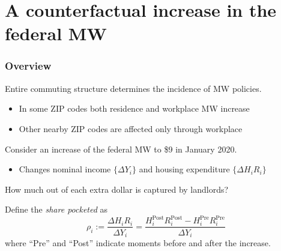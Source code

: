 \documentclass[aspectratio=169, t]{beamer}
\newcommand{\pre}{\text{Pre}}
\newcommand{\post}{\text{Post}}
\begin{document}
\section{A counterfactual increase in the federal MW}

\begin{frame}
    \frametitle{Overview}
    
    Entire commuting structure determines the incidence of MW policies.
    \begin{itemize}
        \vspace{1mm}
        \item In some ZIP codes both residence and workplace MW increase
        \vspace{1mm}
        \item Other nearby ZIP codes are affected only through workplace
    \end{itemize}
    
    \pause
    \vspace{3mm}
    Consider an increase of the federal MW to \$9 in January 2020.
    \begin{itemize}
        \vspace{1mm}
        \item Changes nominal income $\{\Delta Y_i\}$ and housing expenditure $\{\Delta H_i R_i\}$
    \end{itemize}
    
    \vspace{2mm}
    How much out of each extra dollar is captured by landlords?
    \pause 

    \vspace{2mm}
    Define the \textit{share pocketed} as 
    \begin{equation*}
        \rho_i := \frac{\Delta H_i R_i}{\Delta Y_i} =  \frac{H^{\post}_i R^{\post}_i - H^{\pre}_i R^{\pre}_i}{\Delta Y_i}
    \end{equation*}
    where ``Pre'' and ``Post'' indicate moments before and after the increase.
   
\end{frame}
\end{document}
